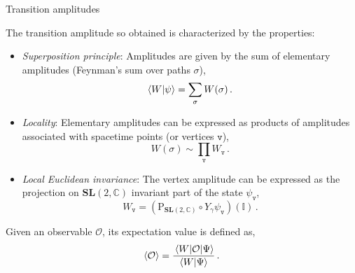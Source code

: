 \documentclass[12pt,titlepage]{article}
\begin{document}
\begin{frame}{Transition amplitudes}
    \begin{list}{\,}{\leftmargin=1em \itemindent=0em}
        \item<1-> The transition amplitude so obtained is characterized by the properties:
        \begin{itemize}
            \item<1-> \textit{Superposition principle}: Amplitudes are given by the sum of elementary amplitudes (Feynman's sum over paths $\sigma$),
            \begin{equation}
                \braket{W}{\psi}=\sum_\sigma W(\sigma)\,.
            \end{equation}
            \item<2-> \textit{Locality}: Elementary amplitudes can be expressed as products of amplitudes associated with spacetime points (or vertices $\mathtt{v}$),
            \begin{equation}
                W(\sigma)\sim\prod_\mathtt{v}W_\mathtt{v}\,.
            \end{equation}
            \item<3-> \textit{Local Euclidean invariance}: The vertex amplitude can be expressed as the projection on $\mathbf{SL}(2,\mathbb{C})$ invariant part of the state $\psi_\mathtt{v}$,
            \begin{equation}
                W_\mathtt{v}=(\operatorname{P_{\mathbf{SL}(2,\mathbb{C})}}\circ Y_\gamma\psi_\mathtt{v})(\mathbb{I})\,.
            \end{equation}
        \end{itemize}
        \item<4-> \vspace{-10pt}Given an observable $\mathcal{O}$, its expectation value is defined as,
        \begin{equation}
            \expval{\mathcal{O}}=\frac{\mel{W}{\mathcal{O}}{\Psi}}{\braket{W}{\Psi}}\,.
        \end{equation}
    \end{list}
\end{frame}
\end{document}
